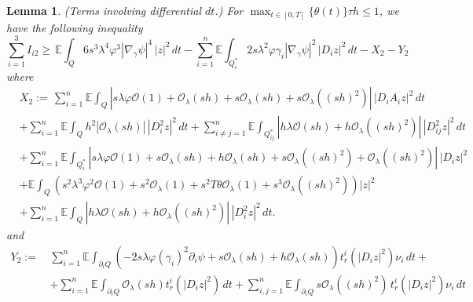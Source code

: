 \documentclass[11pt,oneside,leqno]{amsart}
\numberwithin{equation}{section}
\numberwithin{equation}{section}
\newcommand{\E}{\mathbb{E}}
\newtheorem{lemma}[theorem]{Lemma}
\begin{document}
\begin{lemma}\label{lem:dt}
(\textit{Terms involving differential $dt$.}) For $\displaystyle \max_{t\in[0,T]}\{\theta(t)\}\tau h\leq 1$, we have the following inequality
\begin{equation*}
    \sum_{i=1}^{3}I_{i2}\geq\,\E\int_{Q} 6s^3\lambda^4\varphi^3|\nabla_{\gamma}\psi|^4\,|z|^2\,dt-\sum_{i=1}^{n}\E\int_{Q_{i}^{\ast}}2s\lambda^2\varphi \gamma_{i}|\nabla_{\gamma}\psi|^2\,|D_iz|^2\,dt-X_2-Y_2
\end{equation*}
where
\begin{align*}
&X_{2}:=\,\sum_{i=1}^{n}\E\int_{Q}|s\lambda\varphi\mathcal{O}(1)+\mathcal{O}_{\lambda}(sh)+s\mathcal{O}_{\lambda}(sh)+s\mathcal{O}_{\lambda}((sh)^{2})|\,|D_{i}A_{i}z|^{2}\,dt\\
    &+\sum_{i=1}^{n}\E\int_{Q}h^{2}|\mathcal{O}_{\lambda}(sh)|\,|D_{i}^{2}z|^{2}\,dt+\sum_{i\ne j=1}^{n}\E\int_{Q_{ij}^{*}}\left|h\lambda\mathcal{O}(sh)+h\mathcal{O}_{\lambda}((sh)^{2})\right|\,|D_{ij}^{2}z|^{2}\,dt\\
    &+\sum_{i=1}^{n}\E\int_{Q^{\ast}_{i}}|s\lambda\varphi\mathcal{O}(1)+s\mathcal{O}_{\lambda}(sh)+h\mathcal{O}_{\lambda}(sh)+s\mathcal{O}_{\lambda}((sh)^{2})+\mathcal{O}_{\lambda}((sh)^2)|\, |D_{i}z|^{2}\\
    &+\E\int_{Q}(s^2\lambda^3\varphi^2\mathcal{O}(1)+s^2\mathcal{O}_{\lambda}(1)+s^2T\theta\mathcal{O}_{\lambda}(1)+s^3\mathcal{O}_{\lambda}((sh)^2))|z|^2\\
    &+\sum_{i=1}^{n}\E\int_{Q}\left|h\lambda\mathcal{O}(sh)+h\mathcal{O}_{\lambda}((sh)^{2})\right|\,|D_{i}^{2}z|^{2}\,dt.
\end{align*}
and
\begin{align*}
Y_{2}:=\,&\sum_{i=1}^{n}\E\int_{\partial_{i}Q}\left(-2s\lambda\varphi(\gamma_i)^2\partial_{i}\psi+s\mathcal{O}_{\lambda}(sh)+h\mathcal{O}_{\lambda}(sh)\right)t_{r}^{i}(|D_{i}z|^{2})\nu_{i}\,dt+\\
        &+\sum_{i=1}^{n}\E\int_{\partial_iQ}\mathcal{O}_{\lambda}(sh)t_r^{i}(|D_iz|^2)\,dt+\sum_{i,j=1}^{n}\E\int_{\partial_{i}Q}s\mathcal{O}_{\lambda}((sh)^2)\,t_{r}^{i}(|D_{i}z|^{2})\nu_{i}\,dt
\end{align*}
\end{lemma}

\end{document}

